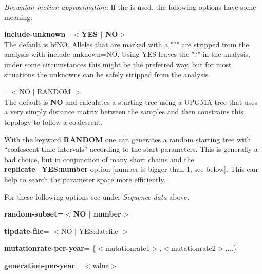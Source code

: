 \textsl{Brownian motion approximation:}
If the {} is used, the following options have some meaning:\begin{description}
\item\textbf{{ include-unknown=$<$YES $|$ NO$>$}}\\ The default is {bf{NO}}. Alleles that are marked with a "?" are stripped from the analysis  with include-unknown=NO. Using YES leaves the "?" in the analysis, under some circumstances this might be the preferred way, but for most situations the unknowns can be safely stripped from the analysis.
\item{=$<$NO $|$  RANDOM $>$}\\
The default is \textbf{NO} and \migrate calculates a starting tree using a UPGMA tree that uses a very simply distance matrix between the samples and then constrains this topology to follow a coalescent. 

 With the keyword \textbf{RANDOM} one can generates a random starting tree with ``coalescent time intervals''  according to the start parameters. This is generally a bad choice,  but in conjunction of many short chains and the \textbf{ replicate=YES:number} 
option [number is bigger than 1, see below]. This can help to search the 
parameter space more efficiently.
\end{description}

For these following options see under \textsl{Sequence data} above.
\begin{description}
\item \textbf{ random-subset=$<$NO $|$ number$>$}
\item\textbf{ tipdate-file}= $<$NO $|$ YES:datefile $>$ 
\item\textbf{ mutationrate-per-year}= \{$<$mutationrate1$>$,$<$mutationrate2$>$,...\} 
\item\textbf{ generation-per-year}= $<$value$>$ 
\end{description}

